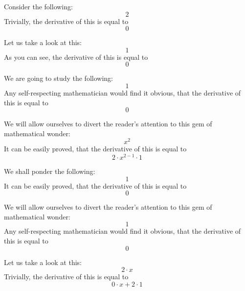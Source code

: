 \documentclass{article}
\begin{document}
Consider the following:
\begin{equation}
2 
\end{equation}
Trivially, the derivative of this is equal to
\begin{equation}
0 
\end{equation}

Let us take a look at this:
\begin{equation}
1 
\end{equation}
As you can see, the derivative of this is equal to
\begin{equation}
0 
\end{equation}

We are going to study the following:
\begin{equation}
1 
\end{equation}
Any self-respecting mathematician would find it obvious, that the derivative of this is equal to
\begin{equation}
0 
\end{equation}

We will allow ourselves to divert the reader's attention to this gem of mathematical wonder:
\begin{equation}
x ^{2 } 
\end{equation}
It can be easily proved, that the derivative of this is equal to
\begin{equation}
2 \cdot x ^{2 - 1 } \cdot 1 
\end{equation}

We shall ponder the following:
\begin{equation}
1 
\end{equation}
It can be easily proved, that the derivative of this is equal to
\begin{equation}
0 
\end{equation}

We will allow ourselves to divert the reader's attention to this gem of mathematical wonder:
\begin{equation}
1 
\end{equation}
Any self-respecting mathematician would find it obvious, that the derivative of this is equal to
\begin{equation}
0 
\end{equation}

Let us take a look at this:
\begin{equation}
2 \cdot x 
\end{equation}
Trivially, the derivative of this is equal to
\begin{equation}
0 \cdot x + 2 \cdot 1 
\end{equation}
\end{document}
